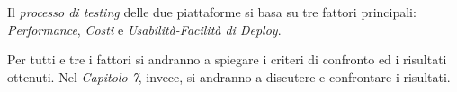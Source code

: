 Il \textit{processo di testing} delle due piattaforme si basa su tre fattori principali: \textit{Performance}, \textit{Costi} e \textit{Usabilità-Facilità di Deploy}.

Per tutti e tre i fattori si andranno a spiegare i criteri di confronto ed i risultati ottenuti. Nel \textit{Capitolo 7}, invece, si andranno a discutere e confrontare i risultati.